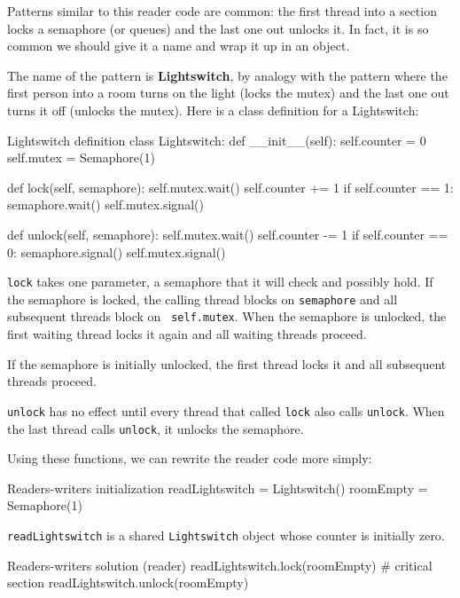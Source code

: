 Patterns similar to this reader code are common: the first thread into
a section locks a semaphore (or queues) and the last one out unlocks
it.  In fact, it is so common we should give it a name and wrap it up
in an object.

The name of the pattern is {\bf Lightswitch}, by analogy with the
pattern where the first person into a room turns on the light (locks
the mutex) and the last one out turns it off (unlocks the mutex).
Here is a class definition for a Lightswitch:

\begin{lstbox}{Lightswitch definition}
class Lightswitch:
    def __init__(self):
        self.counter = 0
        self.mutex = Semaphore(1)

    def lock(self, semaphore):
        self.mutex.wait()
            self.counter += 1
            if self.counter == 1:
                semaphore.wait()
        self.mutex.signal()

    def unlock(self, semaphore):
        self.mutex.wait()
            self.counter -= 1
            if self.counter == 0:
                semaphore.signal()
        self.mutex.signal()
\end{lstbox}

{\tt lock} takes one parameter, a semaphore that it will check and
possibly hold.  If the semaphore is locked, the calling thread blocks
on {\tt semaphore} and all subsequent threads block on {\tt
self.mutex}.  When the semaphore is unlocked, the first waiting thread
locks it again and all waiting threads proceed.

If the semaphore is initially unlocked, the first thread locks it
and all subsequent threads proceed.

{\tt unlock} has no effect until every thread that called {\tt lock}
also calls {\tt unlock}.  When the last thread calls {\tt unlock}, it
unlocks the semaphore.

Using these functions, we can rewrite the reader code
more simply:

\begin{lstbox}{Readers-writers initialization}
readLightswitch = Lightswitch()
roomEmpty = Semaphore(1)
\end{lstbox}

{\tt readLightswitch} is a shared {\tt Lightswitch} object whose counter
is initially zero.

\begin{lstbox}{Readers-writers solution (reader)}
readLightswitch.lock(roomEmpty)
# critical section
readLightswitch.unlock(roomEmpty)
\end{lstbox}

